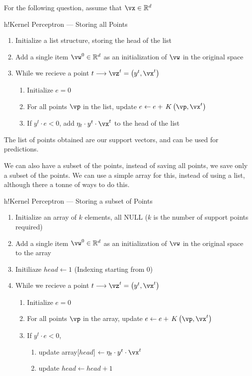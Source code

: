 \documentclass{article}
\begin{document}
\begin{mlsolution}

	For the following question, assume that $\vx \in \R^d$

	\begin{mlalgorithm}[0.8\textwidth]{h!}{Kernel Perceptron --- Storing all Points}
		\begin{enumerate}
			\item Initialize a list structure, storing the head of the list
			\item Add a single item $\vw^0 \in \R^d$ as an initialization of $\vw$ in the original space
			\item While we recieve a point $t \longrightarrow \vz^t = \para{y^t, \vx^t}$
				\begin{enumerate}[label= (\roman*) ]
					\item Initialize $e = 0$
					\item For all points $\vp$ in the list, update $e \gets e + \func{K}{\vp, \vx^t}$
					\item If $y^t \cdot e < 0$, add $\eta_t \cdot y^t \cdot \vx^t$ to the head of the list
				\end{enumerate}
		\end{enumerate}
	\end{mlalgorithm}

	The list of points obtained are our support vectors, and can be used for predictions. \br%

	We can also have a subset of the points, instead of saving all points, we save only a subset of the points. We can use a simple array for this, instead of using a list, although there a tonne of ways to do this.

	\begin{mlalgorithm}[0.8\textwidth]{h!}{Kernel Perceptron --- Storing a subset of Points}
		\begin{enumerate}
			\item Initialize an array of $k$ elements, all NULL ($k$ is the number of support points required)
			\item Add a single item $\vw^0 \in \R^d$ as an initialization of $\vw$ in the original space to the array
			\item Initiliaze $head \gets 1$ (Indexing starting from 0)
			\item While we recieve a point $t \longrightarrow \vz^t = \para{y^t, \vx^t}$
				\begin{enumerate}[label= (\roman*) ]
					\item Initialize $e = 0$
					\item For all points $\vp$ in the array, update $e \gets e + \func{K}{\vp, \vx^t}$
					\item If $y^t \cdot e < 0$,
						\begin{enumerate}[label= ]
							\item update array[$head$] $\gets \eta_t \cdot y^t \cdot \vx^t$
							\item update $head \gets head + 1$
						\end{enumerate}
				\end{enumerate}
		\end{enumerate}
	\end{mlalgorithm}


\end{mlsolution}
\end{document}
